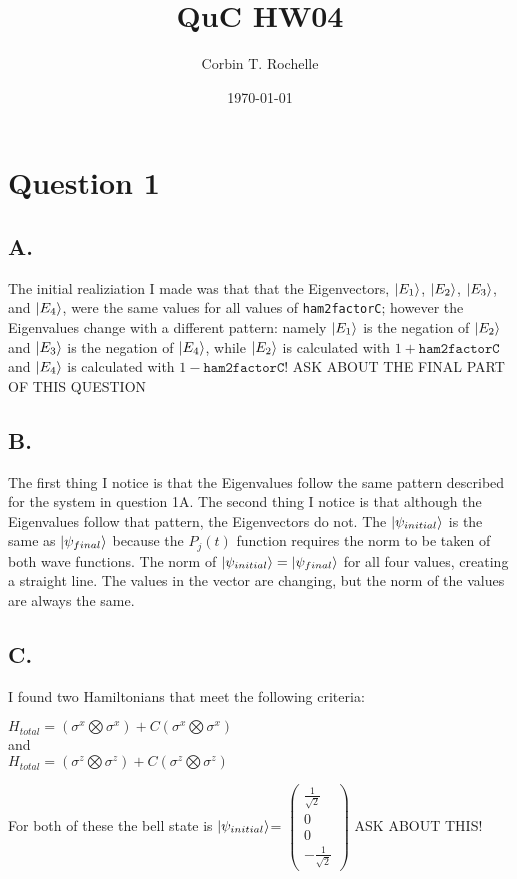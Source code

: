 \documentclass[12pt]{article}
\author{Corbin T. Rochelle}
\title{QuC HW04}
\date{\today}
\begin{document}
\maketitle

\section*{Question 1}
\subsection*{A.}
The initial realiziation I made was that that the Eigenvectors, $\ket{E_1}$, $\ket{E_2}$, $\ket{E_3}$, and $\ket{E_4}$, were the same values for all values of \texttt{ham2factorC};
however the Eigenvalues change with a different pattern: namely $\ket{E_1}$ is the negation of $\ket{E_2}$ and $\ket{E_3}$ is the negation of $\ket{E_4}$, while $\ket{E_2}$ is calculated with $1+\texttt{ham2factorC}$ and $\ket{E_4}$ is calculated with $1-\texttt{ham2factorC}$!
ASK ABOUT THE FINAL PART OF THIS QUESTION
\subsection*{B.}
The first thing I notice is that the Eigenvalues follow the same pattern described for the system in question 1A. 
The second thing I notice is that although the Eigenvalues follow that pattern, the Eigenvectors do not. 
The $\ket{\psi_{initial}}$ is the same as $\ket{\psi_{final}}$ because the $P_j(t)$ function requires the norm to be taken of both wave functions. 
The norm of $\ket{\psi_{initial}}=\ket{\psi_{final}}$ for all four values, creating a straight line.
The values in the vector are changing, but the norm of the values are always the same. 
\subsection*{C.}
I found two Hamiltonians that meet the following criteria:
\begin{center}
    $H_{total} = (\sigma^x \bigotimes \sigma^x) + C (\sigma^x \bigotimes \sigma^x)$\\
    and\\
    $H_{total} = (\sigma^z \bigotimes \sigma^z) + C (\sigma^z \bigotimes \sigma^z)$
\end{center}
For both of these the bell state is $\ket{\psi_{initial}}$=
$
\begin{pmatrix} 
    \frac{1}{\sqrt{2}} \\ 0 \\ 0 \\ -\frac{1}{\sqrt{2}}
\end{pmatrix}
$
ASK ABOUT THIS!
\end{document}

